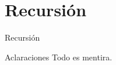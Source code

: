 \documentclass{beamer}
\begin{document}
\section{Recursión}
\begin{frame}{Recursión}      %

\end{frame}
\begin{frame}{Aclaraciones}
  Todo es mentira.
\end{frame}
\end{document}
